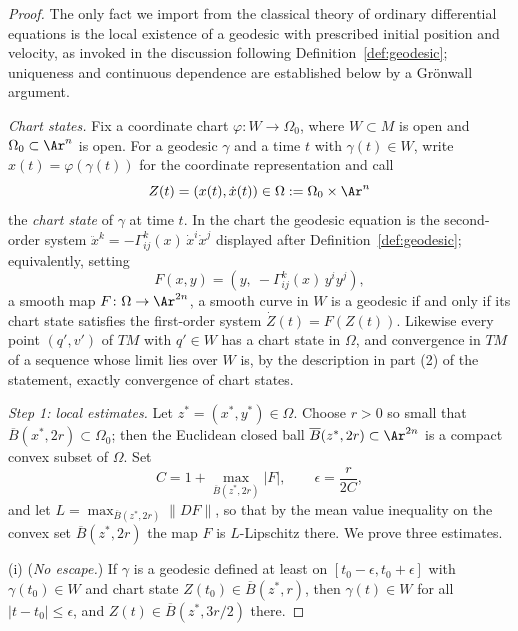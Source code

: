 \begin{proof}
The only fact we import from the classical theory of ordinary
differential equations is the local existence of a geodesic with
prescribed initial position and velocity, as invoked in the
discussion following Definition~\ref{def:geodesic}; uniqueness and
continuous dependence are established below by a Gr\"onwall argument.

{\em Chart states.} Fix a coordinate chart $\varphi\colon W\to
\Omega_0$, where $W\subset M$ is open and $\Omega_0\subset\Ar^n$ is
open. For a geodesic $\gamma$ and a time $t$ with $\gamma(t)\in W$,
write $x(t)=\varphi(\gamma(t))$ for the coordinate representation and
call
$$Z(t)=(x(t),\dot x(t))\in \Omega:=\Omega_0\times\Ar^n$$
the {\em chart state} of $\gamma$ at time $t$. In the chart the
geodesic equation is the second-order system $\ddot
x^k=-\Gamma^k_{ij}(x)\,\dot x^i\dot x^j$ displayed after
Definition~\ref{def:geodesic}; equivalently, setting
$$F(x,y)=\left(y,\ -\Gamma^k_{ij}(x)\,y^iy^j\right),$$
a smooth map $F\colon\Omega\to\Ar^{2n}$, a smooth curve in $W$ is a
geodesic if and only if its chart state satisfies the first-order
system $\dot Z(t)=F(Z(t))$. Likewise every point $(q',v')$ of $TM$
with $q'\in W$ has a chart state in $\Omega$, and convergence in $TM$
of a sequence whose limit lies over $W$ is, by the description in
part (2) of the statement, exactly convergence of chart states.

{\em Step 1: local estimates.} Let $z^*=(x^*,y^*)\in\Omega$. Choose
$r>0$ so small that $\overline{B}(x^*,2r)\subset\Omega_0$; then the
Euclidean closed ball $\overline{B}(z^*,2r)\subset\Ar^{2n}$ is a
compact convex subset of $\Omega$. Set
$$C=1+\max_{\overline{B}(z^*,2r)}|F|,\qquad
\epsilon=\frac{r}{2C},$$
and let $L=\max_{\overline{B}(z^*,2r)}\|DF\|$, so that by the mean
value inequality on the convex set $\overline{B}(z^*,2r)$ the map $F$
is $L$-Lipschitz there. We prove three estimates.

(i) ({\em No escape.}) If $\gamma$ is a geodesic defined at least on
$[t_0-\epsilon,t_0+\epsilon]$ with $\gamma(t_0)\in W$ and chart state
$Z(t_0)\in\overline{B}(z^*,r)$, then $\gamma(t)\in W$ for all
$|t-t_0|\le\epsilon$, and $Z(t)\in\overline{B}(z^*,3r/2)$ there.


\end{proof}
